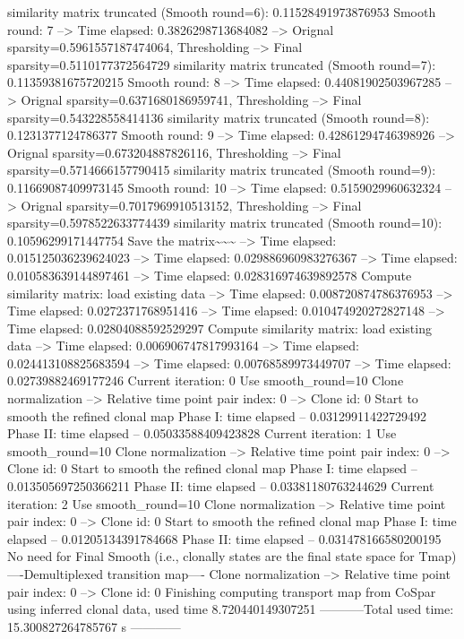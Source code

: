 \documentclass[letterpaper,10pt,english]{sphinxmanual}
\begin{document}
{\begin{sphinxVerbatim}[commandchars=\\\{\}]
similarity matrix truncated (Smooth round=6):  0.11528491973876953
Smooth round: 7
--> Time elapsed: 0.3826298713684082
--> Orignal sparsity=0.5961557187474064, Thresholding
--> Final sparsity=0.5110177372564729
similarity matrix truncated (Smooth round=7):  0.11359381675720215
Smooth round: 8
--> Time elapsed: 0.44081902503967285
--> Orignal sparsity=0.6371680186959741, Thresholding
--> Final sparsity=0.543228558414136
similarity matrix truncated (Smooth round=8):  0.1231377124786377
Smooth round: 9
--> Time elapsed: 0.42861294746398926
--> Orignal sparsity=0.673204887826116, Thresholding
--> Final sparsity=0.5714666157790415
similarity matrix truncated (Smooth round=9):  0.11669087409973145
Smooth round: 10
--> Time elapsed: 0.5159029960632324
--> Orignal sparsity=0.7017969910513152, Thresholding
--> Final sparsity=0.5978522633774439
similarity matrix truncated (Smooth round=10):  0.10596299171447754
Save the matrix\textasciitilde{}\textasciitilde{}\textasciitilde{}
--> Time elapsed:  0.015125036239624023
--> Time elapsed:  0.029886960983276367
--> Time elapsed:  0.010583639144897461
--> Time elapsed:  0.028316974639892578
Compute similarity matrix: load existing data
--> Time elapsed:  0.008720874786376953
--> Time elapsed:  0.0272371768951416
--> Time elapsed:  0.010474920272827148
--> Time elapsed:  0.02804088592529297
Compute similarity matrix: load existing data
--> Time elapsed:  0.006906747817993164
--> Time elapsed:  0.024413108825683594
--> Time elapsed:  0.00768589973449707
--> Time elapsed:  0.02739882469177246
Current iteration: 0
Use smooth\_round=10
Clone normalization
--> Relative time point pair index: 0
--> Clone id: 0
Start to smooth the refined clonal map
Phase I: time elapsed --  0.03129911422729492
Phase II: time elapsed --  0.05033588409423828
Current iteration: 1
Use smooth\_round=10
Clone normalization
--> Relative time point pair index: 0
--> Clone id: 0
Start to smooth the refined clonal map
Phase I: time elapsed --  0.013505697250366211
Phase II: time elapsed --  0.03381180763244629
Current iteration: 2
Use smooth\_round=10
Clone normalization
--> Relative time point pair index: 0
--> Clone id: 0
Start to smooth the refined clonal map
Phase I: time elapsed --  0.01205134391784668
Phase II: time elapsed --  0.031478166580200195
No need for Final Smooth (i.e., clonally states are the final state space for Tmap)
----Demultiplexed transition map----
Clone normalization
--> Relative time point pair index: 0
--> Clone id: 0
Finishing computing transport map from CoSpar using inferred clonal data, used time 8.720440149307251
-----------Total used time: 15.300827264785767 s ------------
\end{sphinxVerbatim}
}
\end{document}
